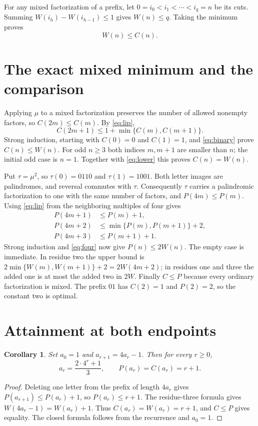 \documentclass[11pt]{article}
\newtheorem{corollary}[theorem]{Corollary}
\begin{document}
For any mixed factorization of a prefix, let
$0=i_0<i_1<\cdots<i_q=n$ be its cuts. Summing
$W(i_h)-W(i_{h-1})\leq1$ gives $W(n)\leq q$.
Taking the minimum proves
\begin{equation}\label{eq:lower}
 W(n)\leq C(n).
\end{equation}

\section{The exact mixed minimum and the comparison}
Applying $\mu$ to a mixed factorization preserves the number of allowed
nonempty factors, so $C(2m)\leq C(m)$. By \eqref{eq:lip},
\[
 C(2m+1)\leq1+\min\{C(m),C(m+1)\}.
\]
Strong induction, starting with $C(0)=0$ and $C(1)=1$, and
\eqref{eq:binary} prove $C(n)\leq W(n)$. For odd $n\geq3$ both
indices $m,m+1$ are smaller than $n$; the initial odd case is $n=1$.
Together with \eqref{eq:lower} this proves $C(n)=W(n)$.

Put $\tau=\mu^2$, so $\tau(0)=0110$ and $\tau(1)=1001$.
Both letter images are palindromes, and reversal commutes with $\tau$.
Consequently $\tau$ carries a palindromic factorization to one with
the same number of factors, and $P(4m)\leq P(m)$.
Using \eqref{eq:lip} from the neighboring multiples of four gives
\begin{align*}
 P(4m+1)&\leq P(m)+1,\\
 P(4m+2)&\leq\min\{P(m),P(m+1)\}+2,\\
 P(4m+3)&\leq P(m+1)+1.
\end{align*}
Strong induction and \eqref{eq:four} now give $P(n)\leq2W(n)$.
The empty case is immediate. In residue two the upper bound is
$2\min\{W(m),W(m+1)\}+2=2W(4m+2)$; in residues one and three
the added one is at most the added two in $2W$.
Finally $C\leq P$ because every ordinary factorization is mixed.
The prefix $01$ has $C(2)=1$ and $P(2)=2$, so the constant two is optimal.

\section{Attainment at both endpoints}
\begin{corollary}\label{cor:equal}
Set $a_0=1$ and $a_{r+1}=4a_r-1$. Then for every $r\geq0$,
\[
 a_r=\frac{2\cdot4^r+1}{3},\qquad P(a_r)=C(a_r)=r+1.
\]
\end{corollary}
\begin{proof}
Deleting one letter from the prefix of length $4a_r$ gives
$P(a_{r+1})\leq P(a_r)+1$, so $P(a_r)\leq r+1$.
The residue-three formula gives
$W(4a_r-1)=W(a_r)+1$. Thus $C(a_r)=W(a_r)=r+1$,
and $C\leq P$ gives equality. The closed formula follows from the
recurrence and $a_0=1$.
\end{proof}
\end{document}

